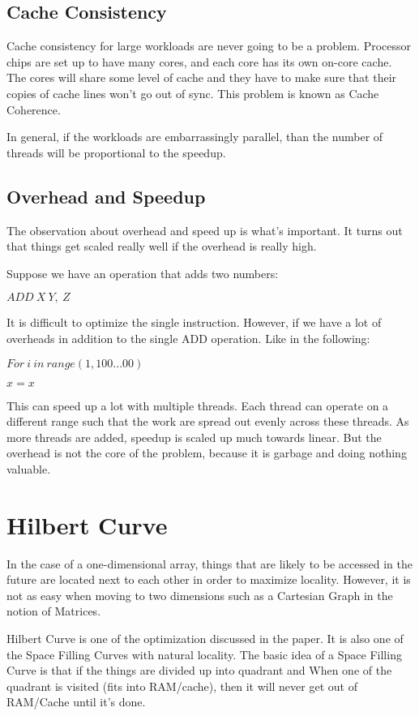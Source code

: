 \documentclass[twoside]{article}
\begin{document}
\subsection{Cache Consistency}
Cache consistency for large workloads are never going to be a problem.
Processor chips are set up to have many cores, and each core has its own on-core cache. The cores will share some level of cache and they have to make sure that their copies of cache lines won't go out of sync. This problem is known as Cache Coherence.

In general, if the workloads are embarrassingly parallel, than the number of threads will be proportional to the speedup.

\subsection{Overhead and Speedup}
The observation about overhead and speed up is what's important. It turns out that things get scaled really well if the overhead is really high.

Suppose we have an operation that adds two numbers:
\begin{center}
$ADD\ X\ Y,\ Z$
\end{center}


It is difficult to optimize the single instruction. However, if we have a lot of overheads in addition to the single ADD operation. Like in the following:

\begin{center}
$For\ i\ in\ range(1,100...00)$ 
\end{center}
\begin{center}
$x=x$ 
\end{center}

This can speed up a lot with multiple threads. Each thread can operate on a different range such that the work are spread out evenly across these threads. As more threads are added, speedup is scaled up much towards linear.
But the overhead is not the core of the problem, because it is garbage and doing nothing valuable.

\section{Hilbert Curve}
In the case of a one-dimensional array, things that are likely to be accessed in the future are located next to each other in order to maximize locality. However, it is not as easy when moving to two dimensions such as a Cartesian Graph in the notion of Matrices.

Hilbert Curve is one of the optimization discussed in the paper. It is also one of the Space Filling Curves with natural locality. The basic idea of a Space Filling Curve is that if the things are divided up into quadrant and When one of the quadrant is visited (fits into RAM/cache), then it will never get out of RAM/Cache until it's done.
\end{document}
